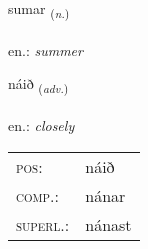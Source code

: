 \documentclass[frontgrid, backgrid]{flacards}\usepackage[]{graphicx}\usepackage[]{xcolor}
\begin{document}
\renewcommand{\blhead}{\vskip5pt {\small\bfseries\footnotesize Nafnorð | Noun }}
\renewcommand{\bcfoot}{\vskip5pt \hspace{2pt}{\small\bfseries\footnotesize 1K}}


{sumar \small{\textsubscript{(\textit{n.})}} \\[1ex] %
\textphonetic{[sʏːmar]} \\
en.: \emph{summer} \\  [2ex]
\renewcommand*{\arraystretch}{0.8}
}

\renewcommand{\flhead}{\vskip5pt \fboxsep=0pt {\small\bfseries\footnotesize Atviksorð | Adverb}}
\renewcommand{\fcfoot}{\vskip5pt \fboxsep=0pt \hspace{2pt}{\small\bfseries\footnotesize 1K}}

\renewcommand{\blhead}{\vskip5pt {\small\bfseries\footnotesize Atviksorð | Adverb }}
\renewcommand{\bcfoot}{\vskip5pt \hspace{2pt}{\small\bfseries\footnotesize 1K}}


{náið \small{\textsubscript{(\textit{adv.})}} \\[1ex] %
\textphonetic{[nauːɪð]} \\
en.: \emph{closely} \\  [2ex]
\renewcommand*{\arraystretch}{0.8}
\begin{tabular}{ll}
\textsc{pos}: & náið \\ 
\textsc{comp.}: & nánar \\ 
\textsc{superl.}: & nánast \\
\end{tabular}
}

\renewcommand{\flhead}{\vskip5pt \fboxsep=0pt {\small\bfseries\footnotesize Sagnorð | Verb}}
\renewcommand{\fcfoot}{\vskip5pt \fboxsep=0pt \hspace{2pt}{\small\bfseries\footnotesize 1K}}
\end{document}
